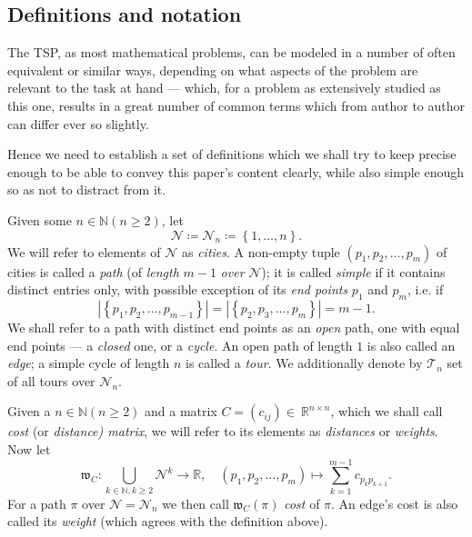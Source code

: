 \documentclass[index=totoc,bibliography=totoc]{scrartcl}
\let\defstyle\itshape
\begin{document}
\subsection{Definitions and notation}

The TSP, as most mathematical problems, can be modeled in a number of often
equivalent or similar ways, depending on what aspects of the problem are
relevant to the task at hand --- which, for a problem as extensively studied
as this one, results in a great number of common terms which from author to
author can differ ever so slightly.

Hence we need to establish a set of definitions which we shall try to keep
precise enough to be able to convey this paper's content clearly,
while also simple enough so as not to distract from it.

\begin{define}
Given some $n \in \mathbb{N} \left(n \geq 2\right)$,
let \[\mathcal{N} \coloneqq \mathcal{N}_n \coloneqq \left\{1,\ldots,n\right\}.\]
We will refer to elements of $\mathcal{N}$ as {\defstyle cities}.
A non-empty tuple $\left(p_1,p_2,\ldots,p_m\right)$
of cities is called a {\defstyle path} (of {\defstyle length} $m-1$ {\defstyle over} $\mathcal{N}$);
it is called {\defstyle simple} if it contains distinct entries only, with
possible exception of its {\defstyle end points} $p_1$ and $p_m$, i.e. if
\[\left|\left\{p_1,p_2,\ldots,p_{m-1}\right\}\right| =
\left|\left\{p_2,p_3,\ldots,p_{m}\right\}\right| = m-1.\]  We shall refer to
a path with distinct end points as an {\defstyle open} path, one with
equal end points --- a {\defstyle closed} one, or a {\defstyle cycle}.
An open path of length $1$ is also called an {\defstyle edge};
a simple cycle of length $n$ is called a {\defstyle tour}.
We additionally denote by $\mathcal{T}_n$ set of all tours over $\mathcal{N}_n$.
\end{define}

\begin{define}
Given a $n \in \mathbb{N} \left(n \geq 2\right)$ and a matrix $C =
\left(c_{ij}\right) \in ~ \mathbb{R}^{n \times n}$, which we shall call
{\defstyle cost} (or {\defstyle distance) matrix}, we will refer to its
elements as {\defstyle distances} or {\defstyle weights}.
Now let \[
  \mathfrak{w}_C: \bigcup_{k \in \mathbb{N}, k \geq 2}\mathcal{N}^k \to \mathbb{R}, \quad
  \left(p_1,p_2,\ldots,p_m\right) \mapsto \sum_{k=1}^{m-1} c_{p_k p_{k+1}}.
\]
For a path $\pi$ over $\mathcal{N} = \mathcal{N}_n$ we then call $\mathfrak{w}_C\left(\pi\right)$ {\defstyle cost} of $\pi$.
An edge's cost is also called its {\defstyle weight} (which agrees with the definition above).
\end{define}
\end{document}
